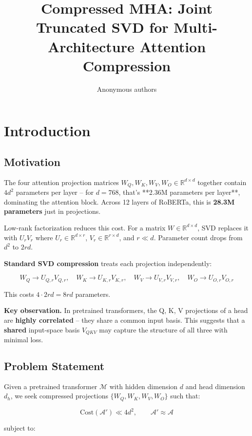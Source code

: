 \title{\textbf{Compressed MHA: Joint Truncated SVD for Multi-Architecture Attention Compression}}

\author{Anonymous authors}


\section{Introduction}

\subsection{Motivation}

The four attention projection matrices $W_Q, W_K, W_V, W_O \in \mathbb{R}^{d \times d}$ 
together contain $4 d^2$ parameters per layer -- for $d = 768$, that's **2.36M 
parameters per layer**, dominating the attention block. Across 12 layers of 
RoBERTa, this is \textbf{28.3M parameters} just in projections.

Low-rank factorization reduces this cost. For a matrix $W \in \mathbb{R}^{d \times d}$, 
SVD replaces it with $U_r V_r$ where $U_r \in \mathbb{R}^{d \times r}$, 
$V_r \in \mathbb{R}^{r \times d}$, and $r \ll d$. Parameter count drops from 
$d^2$ to $2 r d$.

\textbf{Standard SVD compression} treats each projection independently:

\[
W_Q \to U_{Q,r} V_{Q,r}, \quad W_K \to U_{K,r} V_{K,r}, \quad W_V \to U_{V,r} V_{V,r}, \quad W_O \to U_{O,r} V_{O,r}
\]

This costs $4 \cdot 2 r d = 8 r d$ parameters.

\textbf{Key observation.} In pretrained transformers, the Q, K, V projections of a 
head are \textbf{highly correlated} -- they share a common input basis. This suggests 
that a \textbf{shared} input-space basis $V_{QKV}$ may capture the structure of all 
three with minimal loss.

\subsection{Problem Statement}

Given a pretrained transformer $\mathcal{M}$ with hidden dimension $d$ and 
head dimension $d_h$, we seek compressed projections 
$\{W_Q, W_K, W_V, W_O\}$ such that:

\[
\text{Cost}(\mathcal{A}') \ll 4 d^2, \qquad
\mathcal{A}' \approx \mathcal{A}
\]

subject to:

